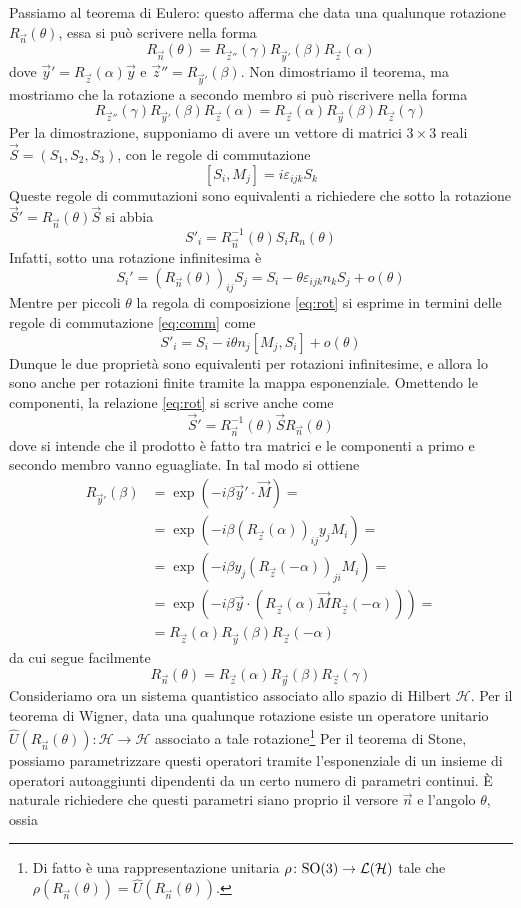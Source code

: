 \documentclass[a4paper, 11pt]{article}
\newcommand{\op}[1]{\hat{#1}}
\renewcommand{\H}{\mathcal{H}}
\renewcommand{\op}[1]{\hat{#1}}
\begin{document}
Passiamo al teorema di Eulero: questo afferma che data una qualunque rotazione $R_\vec{n}(\theta)$, essa si può scrivere nella forma
\[R_\vec{n}(\theta)=R_{\vec{z}''}(\gamma)R_{\vec{y}'}(\beta)R_\vec{z}(\alpha)\]
dove $\vec{y}'=R_\vec{z}(\alpha)\vec{y}$ e $\vec{z}''=R_{\vec{y}'}(\beta)$. Non dimostriamo il teorema, ma mostriamo che la rotazione a secondo membro si può riscrivere nella forma
\[R_{\vec{z}''}(\gamma)R_{\vec{y}'}(\beta)R_\vec{z}(\alpha)=R_\vec{z}(\alpha)R_\vec{y}(\beta)R_\vec{z}(\gamma)\]
Per la dimostrazione, supponiamo di avere un vettore di matrici $3\times 3$ reali $\vec{S}=(S_1,S_2,S_3)$, con le regole di commutazione
\begin{equation}\label{eq:comm}[S_i,M_j]=i\varepsilon_{ijk}S_k\end{equation}
Queste regole di commutazioni sono equivalenti a richiedere che sotto la rotazione $\vec{S}'=R_\vec{n}(\theta)\vec{S}$ si abbia
\begin{equation}\label{eq:rot}S'_i=R^{-1}_\vec{n}(\theta)S_i{R}_n(\theta)\end{equation}
Infatti, sotto una rotazione infinitesima è
\[S_i'=(R_\vec{n}(\theta))_{ij}S_j= S_i-\theta\varepsilon_{ijk}n_kS_j+o(\theta)\]
Mentre per piccoli $\theta$ la regola di composizione \ref{eq:rot} si esprime in termini delle regole di commutazione \ref{eq:comm} come
\[S'_i=S_i-i\theta n_j[M_j,S_i]+o(\theta)\]
Dunque le due proprietà sono equivalenti per rotazioni infinitesime, e allora lo sono anche per rotazioni finite tramite la mappa esponenziale. Omettendo le componenti, la relazione \ref{eq:rot} si scrive anche come
\[\vec{S}'=R_\vec{n}^{-1}(\theta)\vec{S}R_\vec{n}(\theta)\]
dove si intende che il prodotto è fatto tra matrici e le componenti a primo e secondo membro vanno eguagliate. In tal modo si ottiene
\begin{align*}R_{\vec{y}'}(\beta)&=\exp(-i\beta\vec{y}'\cdot\vec{M})=\\&=\exp(-i\beta(R_\vec{z}(\alpha))_{ij}y_j{M}_i)=\\&=\exp(-i\beta{y}_j(R_\vec{z}(-\alpha))_{ji}M_i)=\\&=\exp(-i\beta\vec{y}\cdot(R_\vec{z}(\alpha)\vec{M}R_\vec{z}(-\alpha)))=\\&=R_\vec{z}(\alpha)R_\vec{y}(\beta)R_\vec{z}(-\alpha)
\end{align*}
da cui segue facilmente
\[R_\vec{n}(\theta)=R_\vec{z}(\alpha)R_\vec{y}(\beta)R_\vec{z}(\gamma)\]
Consideriamo ora un sistema quantistico associato allo spazio di Hilbert $\H$. Per il teorema di Wigner, data una qualunque rotazione esiste un operatore unitario $\op U(R_\vec{n}(\theta))\colon\H\to\H$ associato a tale rotazione\footnote{Di fatto è una rappresentazione unitaria $\rho\colon\SO(3)\to\mathcal L(\H)$ tale che $\rho(R_\vec{n}(\theta))=\op U(R_\vec{n}(\theta))$.} Per il teorema di Stone, possiamo parametrizzare questi operatori tramite l'esponenziale di un insieme di operatori autoaggiunti dipendenti da un certo numero di parametri continui. \`{E} naturale richiedere che questi parametri siano proprio il versore $\vec{n}$ e l'angolo $\theta$, ossia
\end{document}
